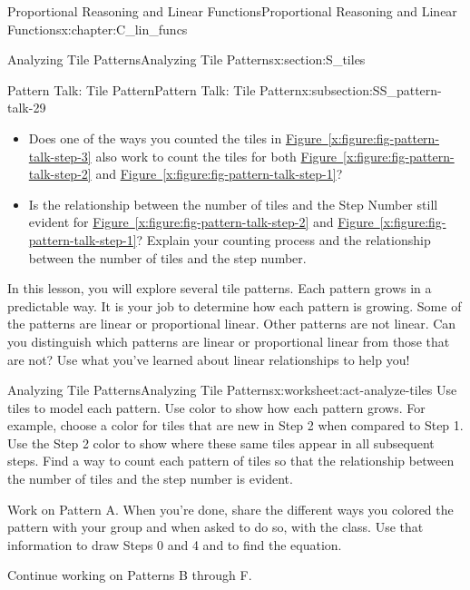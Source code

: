 \documentclass[oneside,10pt,]{book}
\newcommand{\xreffont}{\relax}
\numberwithin{equation}{chapter}
\begin{document}
\begin{chapterptx}{Proportional Reasoning and Linear Functions}{}{Proportional Reasoning and Linear Functions}{}{}{x:chapter:C_lin_funcs}
\begin{sectionptx}{Analyzing Tile Patterns}{}{Analyzing Tile Patterns}{}{}{x:section:S_tiles}
\begin{subsectionptx}{Pattern Talk: Tile Pattern}{}{Pattern Talk: Tile Pattern}{}{}{x:subsection:SS_pattern-talk-29}
\begin{itemize}[label=\textbullet]
\item{}Does one of the ways you counted the tiles in \hyperref[x:figure:fig-pattern-talk-step-3]{Figure~{\xreffont\ref{x:figure:fig-pattern-talk-step-3}}} also work to count the tiles for both \hyperref[x:figure:fig-pattern-talk-step-2]{Figure~{\xreffont\ref{x:figure:fig-pattern-talk-step-2}}} and \hyperref[x:figure:fig-pattern-talk-step-1]{Figure~{\xreffont\ref{x:figure:fig-pattern-talk-step-1}}}?%
\item{}Is the relationship between the number of tiles and the Step Number still evident for \hyperref[x:figure:fig-pattern-talk-step-2]{Figure~{\xreffont\ref{x:figure:fig-pattern-talk-step-2}}} and \hyperref[x:figure:fig-pattern-talk-step-1]{Figure~{\xreffont\ref{x:figure:fig-pattern-talk-step-1}}}? Explain your counting process and the relationship between the number of tiles and the step number.%
\end{itemize}
%
\par
In this lesson, you will explore several tile patterns. Each pattern grows in a predictable way. It is your job to determine how each pattern is growing. Some of the patterns are linear or proportional linear. Other patterns are not linear. Can you distinguish which patterns are linear or proportional linear from those that are not? Use what you've learned about linear relationships to help you!%
\end{subsectionptx}
%
%
\typeout{************************************************}
\typeout{************************************************}
%
\begin{worksheet-subsection}{Analyzing Tile Patterns}{}{Analyzing Tile Patterns}{}{}{x:worksheet:act-analyze-tiles}
Use tiles to model each pattern. Use color to show how each pattern grows. For example, choose a color for tiles that are new in Step 2 when compared to Step 1. Use the Step 2 color to show where these same tiles appear in all subsequent steps. Find a way to count each pattern of tiles so that the relationship between the number of tiles and the step number is evident.%
\par
Work on Pattern A. When you're done, share the different ways you colored the pattern with your group and when asked to do so, with the class. Use that information to draw Steps 0 and 4 and to find the equation.%
\par
Continue working on Patterns B through F.%
\par

\end{worksheet-subsection}
\end{sectionptx}
\end{chapterptx}
\end{document}
